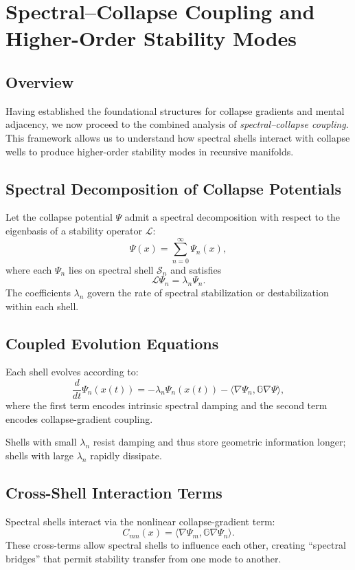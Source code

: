 
\chapter{Spectral–Collapse Coupling and Higher-Order Stability Modes}

\section{Overview}
Having established the foundational structures for collapse gradients and mental adjacency, we now proceed to the combined analysis of \emph{spectral–collapse coupling}. This framework allows us to understand how spectral shells interact with collapse wells to produce higher-order stability modes in recursive manifolds.

\section{Spectral Decomposition of Collapse Potentials}
Let the collapse potential $\Psi$ admit a spectral decomposition with respect to the eigenbasis of a stability operator $\mathcal{L}$:
\[
\Psi(x) = \sum_{n=0}^{\infty} \Psi_n(x),
\]
where each $\Psi_n$ lies on spectral shell $\mathcal{S}_n$ and satisfies
\[
\mathcal{L} \Psi_n = \lambda_n \Psi_n.
\]
The coefficients $\lambda_n$ govern the rate of spectral stabilization or destabilization within each shell.

\section{Coupled Evolution Equations}
Each shell evolves according to:
\[
\frac{d}{dt}\Psi_n(x(t)) = -\lambda_n \Psi_n(x(t)) - \langle \nabla \Psi_n, \mathbb{G}\nabla \Psi \rangle,
\]
where the first term encodes intrinsic spectral damping and the second term encodes collapse-gradient coupling.

Shells with small $\lambda_n$ resist damping and thus store geometric information longer; shells with large $\lambda_n$ rapidly dissipate.

\section{Cross-Shell Interaction Terms}
Spectral shells interact via the nonlinear collapse-gradient term:
\[
C_{mn}(x) = \langle \nabla \Psi_m, \mathbb{G} \nabla \Psi_n \rangle.
\]
These cross-terms allow spectral shells to influence each other, creating ``spectral bridges'' that permit stability transfer from one mode to another.

